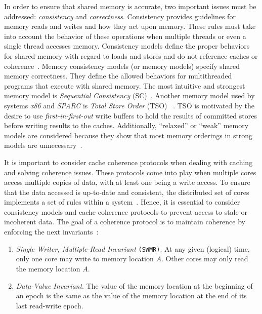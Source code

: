In order to ensure that shared memory is accurate, two important issues must be addressed: \emph{consistency} and \emph{correctness}. Consistency provides guidelines for memory reads and writes and how they act upon memory. These rules must take into account the behavior of these operations when multiple threads or even a single thread accesses memory. Consistency models define the proper behaviors for shared memory with regard to loads and stores and do not reference caches or coherence~\cite{DBLP_series_synthesis_2020Nagarajan}. Memory consistency models (or memory models) specify shared memory correctness. They define the allowed behaviors for multithreaded programs that execute with shared memory. The most intuitive and strongest memory model is \emph{Sequential Consistency} (SC)~\cite{lamport1979how}. Another memory model used by systems \emph{x86} and \emph{SPARC} is \emph{Total Store Order} (TSO) ~\cite{DBLP_conf_tphol_OwensSS09, DBLP_journals_cacm_SewellSONM10, sparc1992sparc}. TSO is motivated by the desire to use \emph{first-in-first-out} write buffers to hold the results of committed stores before writing results to the caches. Additionally, ``relaxed'' or ``weak'' memory models are considered because they show that most memory orderings in strong models are unnecessary~\cite{DBLP_series_synthesis_2020Nagarajan}.


It is important to consider cache coherence protocols when dealing with caching and solving coherence issues. These protocols come into play when multiple cores access multiple copies of data, with at least one being a write access. To ensure that the data accessed is up-to-date and consistent, the distributed set of cores implements a set of rules within a system~\cite{DBLP_series_synthesis_2020Nagarajan}. Hence, it is essential to consider consistency models and cache coherence protocols to prevent access to stale or incoherent data. The goal of a coherence protocol is to maintain coherence by enforcing the next invariants~\cite{DBLP_series_synthesis_2020Nagarajan}:

\begin{enumerate}
  \item \emph{Single Writer, Multiple-Read Invariant} \texttt{(SWMR)}. At any given
 (logical) time, only one core may write to memory location \(A\). Other cores may only read the memory location \(A\).

  \item \emph{Data-Value Invariant}. The value of the memory location at the beginning of an epoch is the same as the value of the memory location at the end of its last read-write epoch.
\end{enumerate}

